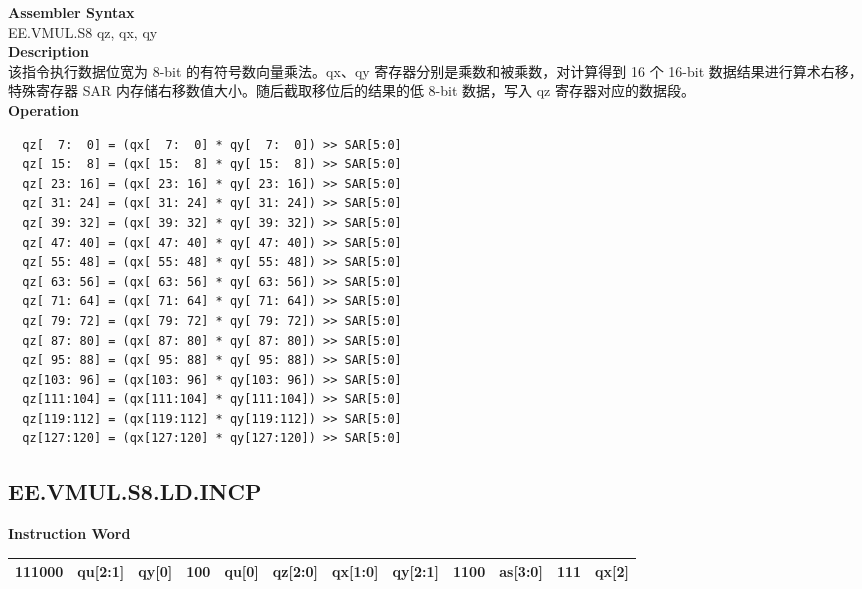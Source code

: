 \textbf{Assembler Syntax} \\
EE.VMUL.S8 qz, qx, qy \\
\textbf{Description} \\
该指令执行数据位宽为 8-bit 的有符号数向量乘法。qx、qy 寄存器分别是乘数和被乘数，对计算得到 16 个 16-bit 数据结果进行算术右移，特殊寄存器 SAR 内存储右移数值大小。随后截取移位后的结果的低 8-bit 数据，写入 qz 寄存器对应的数据段。\\
\textbf{Operation}
\begin{lstlisting}
  qz[  7:  0] = (qx[  7:  0] * qy[  7:  0]) >> SAR[5:0]
  qz[ 15:  8] = (qx[ 15:  8] * qy[ 15:  8]) >> SAR[5:0]
  qz[ 23: 16] = (qx[ 23: 16] * qy[ 23: 16]) >> SAR[5:0]
  qz[ 31: 24] = (qx[ 31: 24] * qy[ 31: 24]) >> SAR[5:0]
  qz[ 39: 32] = (qx[ 39: 32] * qy[ 39: 32]) >> SAR[5:0]
  qz[ 47: 40] = (qx[ 47: 40] * qy[ 47: 40]) >> SAR[5:0]
  qz[ 55: 48] = (qx[ 55: 48] * qy[ 55: 48]) >> SAR[5:0]
  qz[ 63: 56] = (qx[ 63: 56] * qy[ 63: 56]) >> SAR[5:0]
  qz[ 71: 64] = (qx[ 71: 64] * qy[ 71: 64]) >> SAR[5:0]
  qz[ 79: 72] = (qx[ 79: 72] * qy[ 79: 72]) >> SAR[5:0]
  qz[ 87: 80] = (qx[ 87: 80] * qy[ 87: 80]) >> SAR[5:0]
  qz[ 95: 88] = (qx[ 95: 88] * qy[ 95: 88]) >> SAR[5:0]
  qz[103: 96] = (qx[103: 96] * qy[103: 96]) >> SAR[5:0]
  qz[111:104] = (qx[111:104] * qy[111:104]) >> SAR[5:0]
  qz[119:112] = (qx[119:112] * qy[119:112]) >> SAR[5:0]
  qz[127:120] = (qx[127:120] * qy[127:120]) >> SAR[5:0]
\end{lstlisting}

\clearpage
\subsection{EE.VMUL.S8.LD.INCP}\label{instruction:EEVMULS8LDINCP}
\setlength\tabcolsep{6pt}
\textbf{Instruction Word} \\
\begin{tabular}{|c|c|c|c|c|c|c|c|c|c|c|c|}
	\hline
	111000 & qu[2:1] & qy[0] & 100 & qu[0] & qz[2:0] & qx[1:0] & qy[2:1] & 1100 & as[3:0] & 111 & qx[2] \\
	\hline
\end{tabular}

